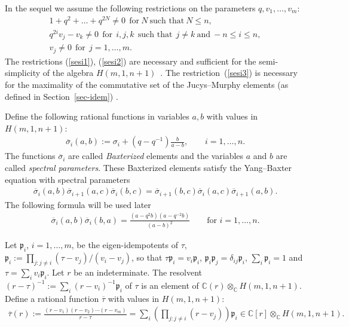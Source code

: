 \documentclass[pdftex]{sigma}
\newcommand{\bsi}{{\overline{\sigma}}}
\newcommand{\bta}{{\overline{\tau}}}
\begin{document}
In the sequel we assume the following restrictions on the parameters $q,v_1,\dots,v_m$:
\begin{gather}\label{sesi1}
 1+q^2+\dots+q^{2N}\neq 0\ \ {\textrm{for}}\ N\ \text{such that}\ N\leq n
 , \\
\label{sesi2}
 q^{2i}v_j-v_k\neq 0\ \ {\textrm{for}}\ \ i,j,k \ \ {\textrm{such that}}\ \  j\neq k \ {\textrm{and}}\ -n\leq i \leq n
 , \\
\label{sesi3}
 v_j\neq 0\ \ \text{for}\ \ j=1,\dots,m  .
\end{gather}
The restrictions (\ref{sesi1}), (\ref{sesi2}) are necessary and suf\/f\/icient for the semi-simplicity of
the algebra $H(m,1,n+1)$~\cite[main theorem]{A}.
The restriction~(\ref{sesi3}) is necessary for the maximality of the commutative
set of the Jucys--Murphy elements (as def\/ined in Section~\ref{sec-idem}) \cite[Proposition~3.2]{A}.



Def\/ine the following rational functions in variables $a,b$ with values in $H(m,1,n+1)$:
\begin{gather}\label{bax-s}
\bsi_i(a,b):=\sigma_i+(q-q^{-1})\frac{b}{a-b}  ,\qquad i=1,\dots,n  .
\end{gather}
The functions $\bsi_i$ are called {\it Baxterized} elements and the variables $a$ and $b$ are called {\it spectral parameters}.
These Baxterized elements satisfy the Yang--Baxter equation with spectral para\-me\-ters
\begin{gather*}
\bsi_i(a,b)\bsi_{i+1}(a,c)\bsi_i(b,c)=\bsi_{i+1}(b,c)\bsi_i(a,c)\bsi_{i+1}(a,b) .
\end{gather*}
The following formula will be used later
\begin{gather}\label{baxt-inv1}
 \bsi_i(a,b)\bsi_i(b,a)=\frac{(a-q^2b)(a-q^{-2}b)}{(a-b)^2} \qquad\textrm{for \ \ $i=1,\dots,n$}.
\end{gather}

Let $\mathfrak{p}_i$, $i=1,\dots,m$,
be the eigen-idempotents of $\tau$, $\mathfrak{p}_i:=\prod\limits_{j:j\neq i} (\tau-v_j)/(v_i-v_j)$, so that $\tau\mathfrak{p}_i=v_i\mathfrak{p}_i$, $\mathfrak{p}_i\mathfrak{p}_j=\delta_{ij}\mathfrak{p}_i$, $\sum_i \mathfrak{p}_i=1$ and $\tau=\sum_i v_i\mathfrak{p}_i$.
Let $r$ be an indeterminate.
The resolvent $(r-\tau)^{-1}:=\sum_i(r-v_i)^{-1}\mathfrak{p}_i$ of $\tau$ is an element of
$\mathbb{C}(r)\otimes_{\mathbb{C}} H(m,1,n+1)$.
Def\/ine a rational function $\bta$ with values in $H(m,1,n+1)$:
\begin{gather}\label{bax-t2}
\bta(r):=\frac{(r-v_1)(r-v_2)\cdots(r-v_m)}{r-\tau}=\sum_i\left(\prod_{j:j\neq i} (r-v_j)\!\right)\!\mathfrak{p}_i\in\mathbb{C}[r]\otimes_{\mathbb{C}} H(m,1,n+1)  .\!\!\!
\end{gather}
\end{document}
